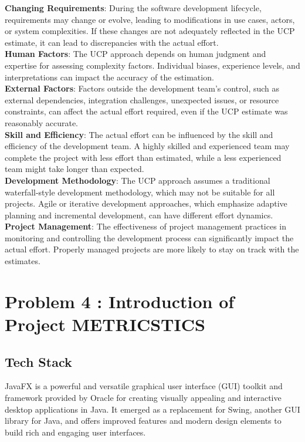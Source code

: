 \documentclass[12pt,letterpaper]{report}
\begin{document}
\textbf{Changing Requirements}: During the software development lifecycle, requirements may change or evolve, leading to modifications in use cases, actors, or system complexities. If these changes are not adequately reflected in the UCP estimate, it can lead to discrepancies with the actual effort.\\

\textbf{Human Factors}: The UCP approach depends on human judgment and expertise for assessing complexity factors. Individual biases, experience levels, and interpretations can impact the accuracy of the estimation.\\

\textbf{External Factors}: Factors outside the development team's control, such as external dependencies, integration challenges, unexpected issues, or resource constraints, can affect the actual effort required, even if the UCP estimate was reasonably accurate.\\

\textbf{Skill and Efficiency}: The actual effort can be influenced by the skill and efficiency of the development team. A highly skilled and experienced team may complete the project with less effort than estimated, while a less experienced team might take longer than expected.\\

\textbf{Development Methodology}: The UCP approach assumes a traditional waterfall-style development methodology, which may not be suitable for all projects. Agile or iterative development approaches, which emphasize adaptive planning and incremental development, can have different effort dynamics.\\

\textbf{Project Management}: The effectiveness of project management practices in monitoring and controlling the development process can significantly impact the actual effort. Properly managed projects are more likely to stay on track with the estimates.\\
\chapter{Problem 4 : Introduction of Project METRICSTICS}

\section{Tech Stack}
JavaFX is a powerful and versatile graphical user interface (GUI) toolkit and framework provided by Oracle for creating visually appealing and interactive desktop applications in Java. It emerged as a replacement for Swing, another GUI library for Java, and offers improved features and modern design elements to build rich and engaging user interfaces.\\
\end{document}
